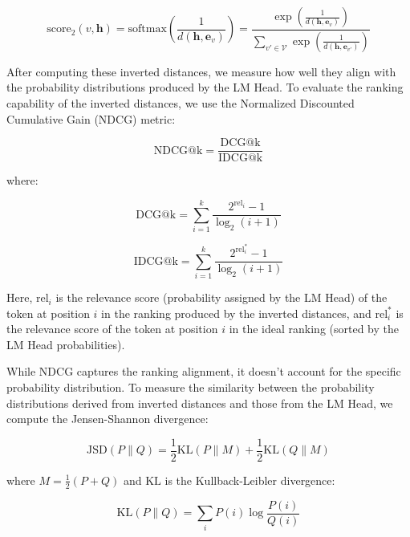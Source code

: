 \begin{equation}
    \text{score}_2(v, \mathbf{h}) = \text{softmax}\left(\frac{1}{d(\mathbf{h}, \mathbf{e}_v)}\right) = \frac{\exp\left(\frac{1}{d(\mathbf{h}, \mathbf{e}_v)}\right)}{\sum_{v' \in \mathcal{V}} \exp\left(\frac{1}{d(\mathbf{h}, \mathbf{e}_{v'})}\right)}
    \label{eq::softmax_inverse_distance}
\end{equation}

After computing these inverted distances, we measure how well they align with the probability distributions produced by the LM Head. To evaluate the ranking capability of the inverted distances, we use the Normalized Discounted Cumulative Gain (NDCG) metric:

\begin{equation}
    \text{NDCG@k} = \frac{\text{DCG@k}}{\text{IDCG@k}}
    \label{eq::ndcg_metric}
\end{equation}

where:

\begin{equation}
    \text{DCG@k} = \sum_{i=1}^{k} \frac{2^{\text{rel}_i} - 1}{\log_2(i+1)}
    \label{eq::dcg}
\end{equation}

\begin{equation}
    \text{IDCG@k} = \sum_{i=1}^{k} \frac{2^{\text{rel}_i^*} - 1}{\log_2(i+1)}
    \label{eq::idcg}
\end{equation}

Here, $\text{rel}_i$ is the relevance score (probability assigned by the LM Head) of the token at position $i$ in the ranking produced by the inverted distances, and $\text{rel}_i^*$ is the relevance score of the token at position $i$ in the ideal ranking (sorted by the LM Head probabilities).

While NDCG captures the ranking alignment, it doesn't account for the specific probability distribution. To measure the similarity between the probability distributions derived from inverted distances and those from the LM Head, we compute the Jensen-Shannon divergence:

\begin{equation}
    \text{JSD}(P \parallel Q) = \frac{1}{2} \text{KL}(P \parallel M) + \frac{1}{2} \text{KL}(Q \parallel M)
    \label{eq::jsd}
\end{equation}

where $M = \frac{1}{2}(P + Q)$ and $\text{KL}$ is the Kullback-Leibler divergence:

\begin{equation}
    \text{KL}(P \parallel Q) = \sum_{i} P(i) \log\frac{P(i)}{Q(i)}
    \label{eq::kl}
\end{equation}

